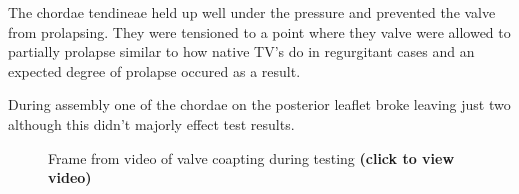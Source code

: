 The chordae tendineae held up well under the pressure and prevented the valve from prolapsing. They were tensioned to a point where they valve were allowed to partially prolapse similar to how native \gls{TV}'s do in regurgitant cases and an expected degree of prolapse occured as a result.

During assembly one of the chordae on the posterior leaflet broke leaving just two although this didn't majorly effect test results.

\begin{figure}
    \begin{fullwidth}
        \centering
        \quad
        \caption{Frame from video of valve coapting during testing \textbf{(click to view video)}}
        \label{fig:Videos}
    \end{fullwidth}
\end{figure}